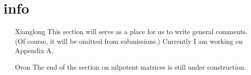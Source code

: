 \section*{info}
\begin{itemize}
	\item[Xianglong] This section will serve as a place for us to write general comments. (Of course, it will be omitted from submissions.) Currently I am working on Appendix A.

    \item[Oron] The end of the section on nilpotent matrices is still under construction.
\end{itemize}
